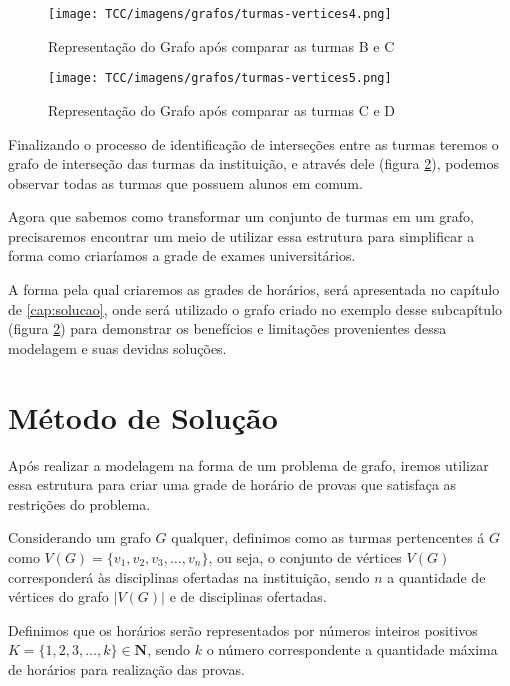 \begin{figure}[H]
     \centering
     \texttt{[image: TCC/imagens/grafos/turmas-vertices4.png]}
     \caption{Representação do Grafo após comparar as turmas B e C}
     \label{grafo-turmas4}
\end{figure}

\begin{figure}[H]
     \centering
     \texttt{[image: TCC/imagens/grafos/turmas-vertices5.png]}
     \caption{Representação do Grafo após comparar as turmas C e D}
     \label{grafo-turmas5}
\end{figure}

Finalizando o processo de identificação de interseções entre as turmas teremos o grafo de interseção das turmas da instituição, e através dele (figura \ref{grafo-turmas5}), podemos observar todas as turmas que possuem alunos em comum.

Agora que sabemos como transformar um conjunto de turmas em um grafo, precisaremos encontrar um meio de utilizar essa estrutura para simplificar a forma como criaríamos a grade de exames universitários.

A forma pela qual criaremos as grades de horários, será apresentada no capítulo de \ref{cap:solucao}, onde será utilizado o grafo criado no exemplo desse subcapítulo (figura \ref{grafo-turmas5}) para demonstrar os benefícios e limitações provenientes dessa modelagem e suas devidas soluções.







\chapter{Método de Solução}
\pagestyle{simple}
\label{cap:solucao}

Após realizar a modelagem na forma de um problema de grafo, iremos utilizar essa estrutura para criar uma grade de horário de provas que satisfaça as restrições do problema.

Considerando um grafo $G$ qualquer, definimos como as turmas pertencentes á $G$ como $V(G) = \{v_1, v_2, v_3, …, v_n\}$, ou seja, o conjunto de vértices $V(G)$ corresponderá às disciplinas ofertadas na instituição, sendo $n$ a quantidade de vértices do grafo $|V(G)|$ e de disciplinas ofertadas.

Definimos que os horários serão representados por números inteiros positivos $K = \{1, 2, 3, …, k\} \in \mathbf{N}$, sendo $k$ o número correspondente a quantidade máxima de horários para realização das provas.

